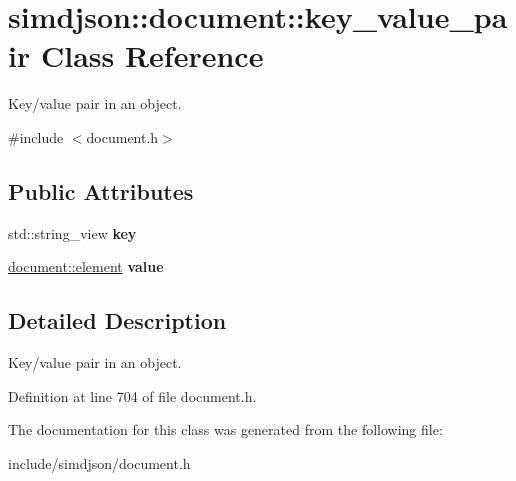 \hypertarget{classsimdjson_1_1document_1_1key__value__pair}{}\section{simdjson\+:\+:document\+:\+:key\+\_\+value\+\_\+pair Class Reference}
\label{classsimdjson_1_1document_1_1key__value__pair}


Key/value pair in an object.  




{\ttfamily \#include $<$document.\+h$>$}

\subsection*{Public Attributes}
\begin{DoxyCompactItemize}
\item 
\mbox{\label{classsimdjson_1_1document_1_1key__value__pair_a9c35a679f02d7feb2913c760fdec33d7}} 
std\+::string\+\_\+view {\bfseries key}
\item 
\mbox{\label{classsimdjson_1_1document_1_1key__value__pair_a75a8ddcb41eb04179a500f9c65a11e20}} 
\hyperlink{classsimdjson_1_1document_1_1element}{document\+::element} {\bfseries value}
\end{DoxyCompactItemize}


\subsection{Detailed Description}
Key/value pair in an object. 

Definition at line 704 of file document.\+h.



The documentation for this class was generated from the following file\+:\begin{DoxyCompactItemize}
\item 
include/simdjson/document.\+h\end{DoxyCompactItemize}
